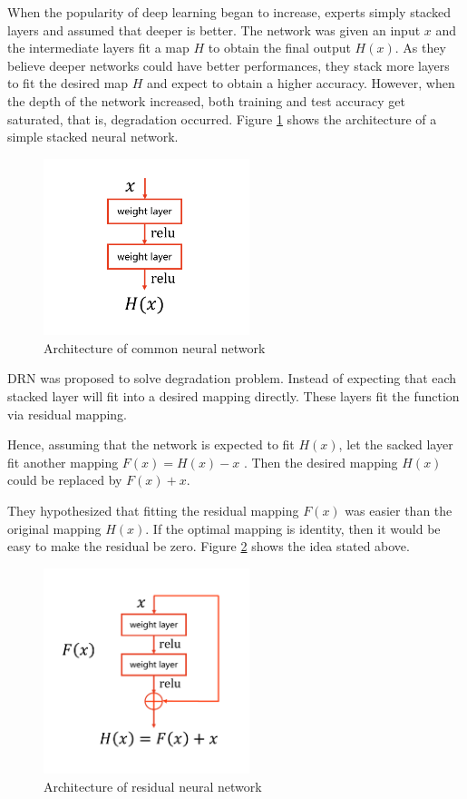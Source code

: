 \documentclass[twocolumn]{article}
\begin{document}
When the popularity of deep learning began to increase, experts simply stacked layers and assumed that deeper is better. The network was given an input $x$ and the intermediate layers fit a map $H$ to obtain the final output $H(x)$. As they believe deeper networks could have better performances, they stack more layers to fit the desired map $H$ and expect to obtain a higher accuracy. However, when the depth of the network increased, both training and test accuracy get saturated, that is, degradation occurred\citep{DRN}. Figure \ref{fig:com_nn} shows the architecture of a simple stacked neural network.
\begin{figure}[H]
\centering
    \includegraphics[width = 6cm]{fig/common_NN}
    \caption{Architecture of common neural network}
    \label{fig:com_nn}
\end{figure}
\par
DRN was proposed to solve degradation problem. Instead of expecting that each stacked layer will fit into a desired mapping directly. These layers fit the function via residual mapping.
\par
Hence, assuming that the network is expected to fit $H(x)$, \citet{DRN} let the sacked layer fit another mapping $F(x) = H(x) - x$ . Then the desired mapping $H(x)$ could be replaced by $F(x)+x$.
\par
They hypothesized that fitting the residual mapping $F(x)$ was easier than the original mapping $H(x)$. If the optimal mapping is identity, then it would be easy to make the residual be zero. Figure \ref{fig:res_nn} shows the idea stated above.
\begin{figure}[H]
    \centering
    \includegraphics[width = 6cm]{fig/residual_NN.pdf}
    \caption{Architecture of residual neural network}
    \label{fig:res_nn}
\end{figure}
\end{document}
